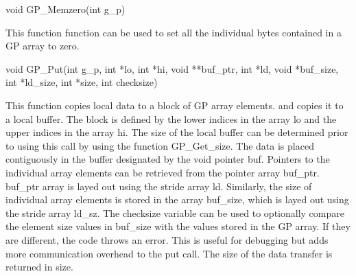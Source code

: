 \documentclass[12pt]{article}
\begin{document}


\begin{capi}
\begin{ccode}
void GP\_Memzero(int g\_p)
\begin{funcargs}
\end{funcargs}
\end{ccode}
\end{capi}

\local

\begin{desc}

This function function can be used to set all the individual bytes
contained in a GP array to zero.

\end{desc}


\begin{capi}
\begin{ccode}
void GP\_Put(int g\_p, int *lo, int *hi, void **buf\_ptr, int *ld,
             void *buf\_size, int *ld\_size, int *size, int checksize)
\begin{funcargs}
\end{funcargs}
\end{ccode}
\end{capi}

\local

\begin{desc}

This function copies local data to a block of GP array elements.
and copies it to a local
buffer. The block is defined by the lower indices in the array lo
and the upper indices in the array hi. The size of the local buffer can be
determined prior to using this call by using the function GP\_Get\_size. The
data is placed contiguously in the buffer designated by the void pointer buf.
Pointers to the individual array elements can be retrieved from the pointer
array buf\_ptr. buf\_ptr array is layed out using the stride array ld. Similarly,
the size of individual array elements is stored in the array buf\_size, which is
layed out using the stride array ld\_sz. The checksize variable can be used to
optionally compare the element size values in buf\_size with the values stored in
the GP array. If they are different, the code throws an error. This is useful
for debugging but adds more communication overhead to the put call. The size of
the data transfer is returned in size.

\end{desc}
\end{document}
